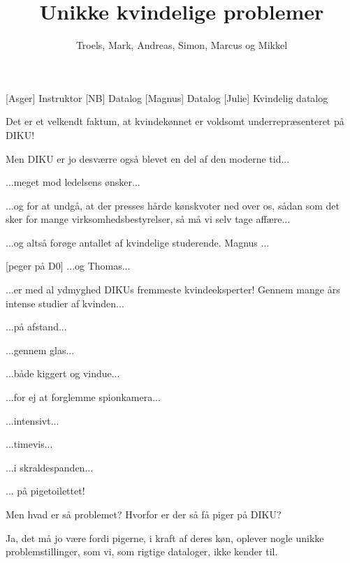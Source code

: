 \documentclass[a4paper,11pt]{article}
\title{Unikke kvindelige problemer}
\author{Troels, Mark, Andreas, Simon, Marcus og Mikkel}
\begin{document}
\maketitle

\begin{roles}
    [Asger] Instruktor
    [NB] Datalog
    [Magnus] Datalog
    [Julie] Kvindelig datalog
\end{roles}

\begin{props}
\end{props}

\begin{sketch}
   Det er et velkendt faktum, at kvindekønnet er voldsomt
  underrepræsenteret på DIKU!

   Men DIKU er jo desværre også blevet en del af den moderne
  tid...

   ...meget mod ledelsens ønsker...

   ...og for at undgå, at der presses hårde kønskvoter ned
  over os, sådan som det sker for mange virksomhedsbestyrelser, så må
  vi selv tage affære...

   ...og altså forøge antallet af kvindelige studerende. Magnus ...

  [peger på D0] ...og Thomas...


   ...er med al ydmyghed DIKUs fremmeste kvindeeksperter!
  Gennem mange års intense studier af kvinden...

   ...på afstand...

   ...gennem glas...

   ...både kiggert og vindue...

   ...for ej at forglemme spionkamera...

   ...intensivt...

   ...timevis...

   ...i skraldespanden...

   ... på pigetoilettet!


   Men hvad er så problemet?  Hvorfor er der så få piger på
  DIKU?

   Ja, det må jo være fordi pigerne, i kraft af deres køn,
  oplever nogle unikke problemstillinger, som vi, som rigtige
  dataloger, ikke kender til.


\end{sketch}
\end{document}
